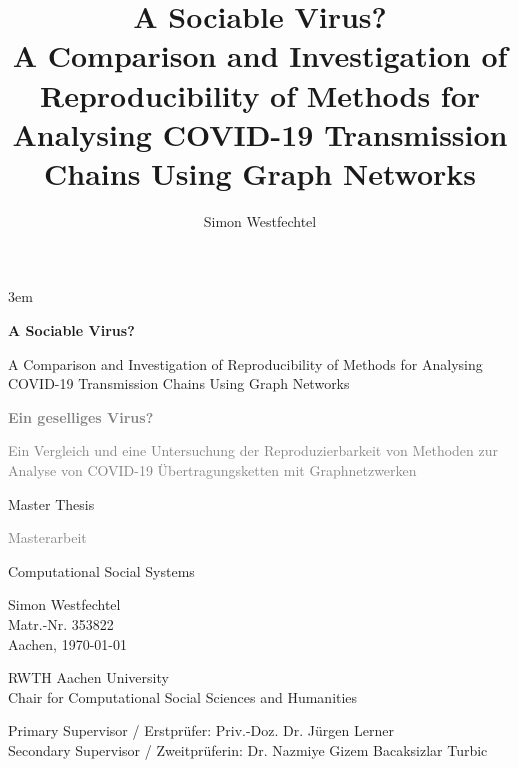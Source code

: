 \documentclass[12pt,a4paper]{report}
\title{
	A Sociable Virus? \\
	A Comparison and Investigation of Reproducibility of Methods for Analysing COVID-19 Transmission Chains Using Graph Networks
}
\author{Simon Westfechtel}
\begin{document}
	\emergencystretch 3em
	\begin{titlepage}
		\begin{center}
			\vspace*{1cm}
			
			\Huge
			\textbf{A Sociable Virus?}
			
			\vspace{0.5cm}
			\LARGE
			A Comparison and Investigation of Reproducibility of Methods for Analysing COVID-19 Transmission Chains Using Graph Networks
			
			\vspace{1cm}
			\large
			\textcolor{gray}{\textbf{Ein geselliges Virus?}}
			
			\vspace{0.5cm}
			\normalsize
			\textcolor{gray}{Ein Vergleich und eine Untersuchung der Reproduzierbarkeit von Methoden zur Analyse von COVID-19 Übertragungsketten mit Graphnetzwerken}
			
			\vfill
			
			\LARGE
			Master Thesis
			
			\large
			\textcolor{gray}{Masterarbeit}
			
			\vspace{0.4cm}
			
			\LARGE
			Computational Social Systems
			
			\vspace{0.8cm}
			
			\large
			Simon Westfechtel\\
			Matr.-Nr. 353822\\
			Aachen, \today
			\vfill
			
			\Large
			RWTH Aachen University\\
			Chair for Computational Social Sciences and Humanities\\
			
			\vfill
			\begin{flushleft}
				\normalsize
				Primary Supervisor / Erstprüfer: Priv.-Doz. Dr. Jürgen Lerner\\
				Secondary Supervisor / Zweitprüferin: Dr. Nazmiye Gizem Bacaksizlar Turbic\\
			\end{flushleft}
			
		\end{center}
	\end{titlepage}
\end{document}
